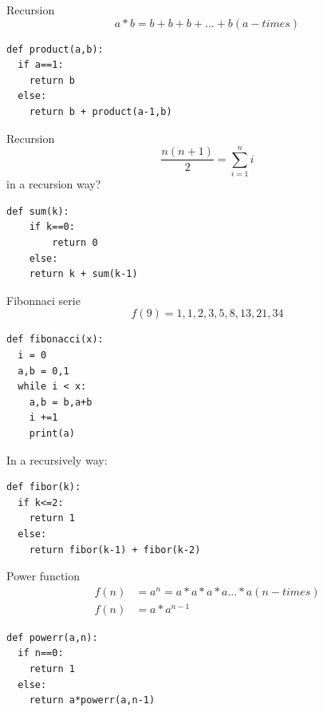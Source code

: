 \documentclass{beamer}
\begin{document}
\begin{frame}[fragile]{Recursion}
\begin{equation}
a*b = b+b+b+...+b (a-times)
\end{equation}
\begin{lstlisting}
def product(a,b):
  if a==1:
    return b
  else:
    return b + product(a-1,b)
\end{lstlisting}
\end{frame}


\begin{frame}[fragile]{Recursion}
\begin{equation}
\frac{n(n+1)}{2} = \sum_{i=1}^{n}i
\end{equation}
in  a recursion way?
\begin{lstlisting}
def sum(k):
	if k==0:
		return 0
	else:
	return k + sum(k-1)
\end{lstlisting}
\end{frame}




\begin{frame}[fragile]{Fibonnaci serie}
\begin{equation}
f(9) = 1,1,2,3,5,8,13,21,34
\end{equation}
\begin{lstlisting}
def fibonacci(x):
  i = 0
  a,b = 0,1
  while i < x:
    a,b = b,a+b
    i +=1
    print(a)
\end{lstlisting}
In a recursively way:

\begin{lstlisting}
def fibor(k):
  if k<=2:
    return 1
  else:
    return fibor(k-1) + fibor(k-2)
\end{lstlisting}
\end{frame}






\begin{frame}[fragile]{Power function}
\begin{equation}
\begin{align*}
f(n) &= a^{n} = a*a*a*a...*a(n-times) \\
f(n) &= a*a^{n-1}
\end{align*}
\end{equation}

\begin{lstlisting}
def powerr(a,n):
  if n==0:
    return 1
  else:
    return a*powerr(a,n-1)
\end{lstlisting}
\end{frame}
\end{document}
